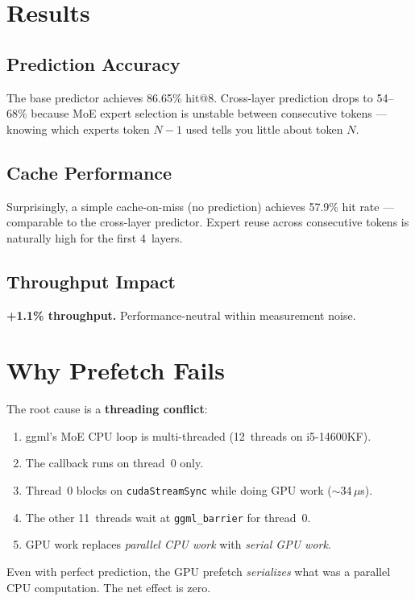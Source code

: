 \documentclass[10pt,a4paper]{article}
\begin{document}
\section{Results}

\subsection{Prediction Accuracy}

The base predictor achieves 86.65\% hit@8. Cross-layer prediction drops to 54--68\% because MoE expert selection is unstable between consecutive tokens --- knowing which experts token $N{-}1$ used tells you little about token $N$.

\subsection{Cache Performance}

Surprisingly, a simple cache-on-miss (no prediction) achieves 57.9\% hit rate --- comparable to the cross-layer predictor. Expert reuse across consecutive tokens is naturally high for the first 4~layers.

\subsection{Throughput Impact}

\textbf{+1.1\% throughput.} Performance-neutral within measurement noise.

\section{Why Prefetch Fails}

The root cause is a \textbf{threading conflict}:

\begin{enumerate}
  \item ggml's MoE CPU loop is multi-threaded (12~threads on i5-14600KF).
  \item The callback runs on thread~0 only.
  \item Thread~0 blocks on \texttt{cudaStreamSync} while doing GPU work ($\sim$34\,$\mu$s).
  \item The other 11~threads wait at \texttt{ggml\_barrier} for thread~0.
  \item GPU work replaces \emph{parallel CPU work} with \emph{serial GPU work}.
\end{enumerate}

Even with perfect prediction, the GPU prefetch \emph{serializes} what was a parallel CPU computation. The net effect is zero.
\end{document}
